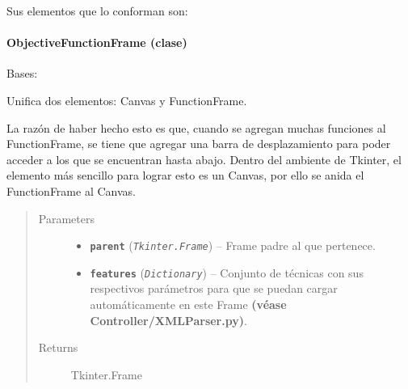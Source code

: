 \documentclass[letterpaper,10pt,english]{sphinxmanual}
\begin{document}
Sus elementos que lo conforman son:


\paragraph{ObjectiveFunctionFrame (clase)}
\label{View/Main/ObjectiveFunction/ObjectiveFunctionFrame:objectivefunctionframe-clase}\label{View/Main/ObjectiveFunction/ObjectiveFunctionFrame::doc}\label{View/Main/ObjectiveFunction/ObjectiveFunctionFrame:module-View.Main.ObjectiveFunction.ObjectiveFunctionFrame}

\begin{fulllineitems}
\label{View/Main/ObjectiveFunction/ObjectiveFunctionFrame:View.Main.ObjectiveFunction.ObjectiveFunctionFrame.ObjectiveFunctionFrame}
Bases: 

\begin{DUlineblock}{0em}
\item[] Unifica dos elementos: Canvas y FunctionFrame.
\item[] La razón de haber hecho esto es que, cuando se agregan muchas funciones al
FunctionFrame, se tiene que agregar una barra de desplazamiento para poder
acceder a los que se encuentran hasta abajo. Dentro del ambiente de Tkinter, el
elemento más sencillo para lograr esto es un Canvas, por ello se anida el
FunctionFrame al Canvas.
\end{DUlineblock}
\begin{quote}\begin{description}
\item[{Parameters}] \leavevmode\begin{itemize}
\item {} 
\textbf{\texttt{parent}} (\emph{\texttt{Tkinter.Frame}}) -- Frame padre al que pertenece.

\item {} 
\textbf{\texttt{features}} (\emph{\texttt{Dictionary}}) -- Conjunto de técnicas con sus respectivos parámetros para que
se puedan cargar automáticamente en este Frame \textbf{(véase
Controller/XMLParser.py)}.

\end{itemize}

\item[{Returns}] \leavevmode
Tkinter.Frame


\end{description}
\end{quote}
\end{fulllineitems}
\end{document}
